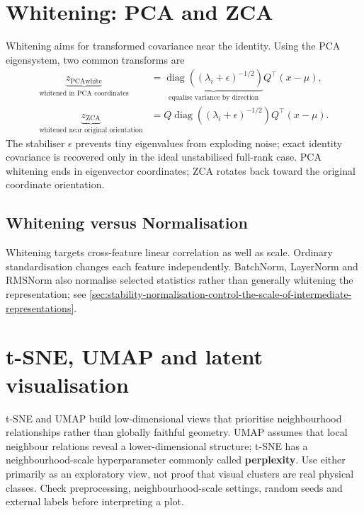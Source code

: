 \section{Whitening: PCA and ZCA}
\label{sec:representation-whitening-pca-and-zca}
Whitening aims for transformed covariance near the identity.
Using the PCA eigensystem, two common transforms are
\begin{align}
    \underbrace{z_{\mathrm{PCAwhite}}}_{\text{whitened in PCA coordinates}}
    &=
    \underbrace{\operatorname{diag}\!\left((\lambda_i+\epsilon)^{-1/2}\right)}_{\text{equalise variance by direction}}
    Q^\top(x-\mu),\\
    \underbrace{z_{\mathrm{ZCA}}}_{\text{whitened near original orientation}}
    &=
    Q\operatorname{diag}\!\left((\lambda_i+\epsilon)^{-1/2}\right)Q^\top(x-\mu).
\end{align}
The stabiliser $\epsilon$ prevents tiny eigenvalues from exploding noise; exact identity covariance is recovered only in the ideal unstabilised full-rank case.
PCA whitening ends in eigenvector coordinates; ZCA rotates back toward the original coordinate orientation.


\subsection{Whitening versus Normalisation}
\label{sec:representation-whitening-versus-normalisation}
Whitening targets cross-feature linear correlation as well as scale.
Ordinary standardisation changes each feature independently.
BatchNorm, LayerNorm and RMSNorm also normalise selected statistics rather than generally whitening the representation; see \cref{sec:stability-normalisation-control-the-scale-of-intermediate-representations}.

\section{t-SNE, UMAP and latent visualisation}
\label{sec:representation-t-sne-umap-and-latent-visualisation}
t-SNE and UMAP build low-dimensional views that prioritise neighbourhood relationships rather than globally faithful geometry.
UMAP assumes that local neighbour relations reveal a lower-dimensional structure; t-SNE has a neighbourhood-scale hyperparameter commonly called \textbf{perplexity}.
Use either primarily as an exploratory view, not proof that visual clusters are real physical classes.
Check preprocessing, neighbourhood-scale settings, random seeds and external labels before interpreting a plot.

